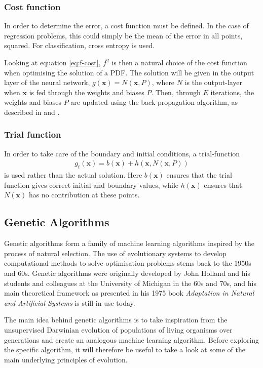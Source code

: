 \documentclass[multicolumn, 9pt]{extarticle}
\begin{document}
\subsubsection{Cost function}
In order to determine the error, a cost function must be defined. In the case of regression problems, this could simply be the mean of the error in all points, squared. For classification, cross entropy is used. 

Looking at equation \eqref{eq:f-cost}, $f^2$ is then a natural choice of the cost function when optimising the solution of a PDF. The solution will be given in the output layer of the neural network, $g(\mathbf{x}) = N(\mathbf{x}, P)$, where $N$ is the output-layer when $\mathbf{x}$ is fed through the weights and biases $P$.
Then, through $E$ iterations, the weights and biases $P$ are updated using the back-propagation algorithm, as described in \cite{p2S} and \cite{p2HO}.

\subsubsection{Trial function}\label{sec:trialf}
In order to take care of the boundary and initial conditions, a trial-function
\begin{align*}
	g_t(\mathbf{x}) = b(\mathbf{x}) + h(\mathbf{x}, N(\mathbf{x}, P))
\end{align*}
is used rather than the actual solution. Here $b(\mathbf{x})$ ensures that the trial function gives correct initial and boundary values, while $h(\mathbf{x})$ ensures that $N(\mathbf{x})$ has no contribution at these points.




\subsection{Genetic Algorithms}
Genetic algorithms form a family of machine learning algorithms inspired by the process of natural selection. The use of evolutionary systems to develop computational methods to solve optimisation problems stems back to the 1950s and 60s. Genetic algorithms were originally developed by John Holland and his students and colleagues at the University of Michigan in the 60s and 70s, and his main theoretical framework as presented in his 1975 book \textit{Adaptation in Natural and Artificial Systems} \cite{Holland} is still in use today.

The main idea behind genetic algorithms is to take inspiration from the unsupervised Darwinian evolution of populations of living organisms over generations and create an analogous machine learning algorithm. Before exploring the specific algorithm, it will therefore be useful to take a look at some of the main underlying principles of evolution. 
\end{document}
